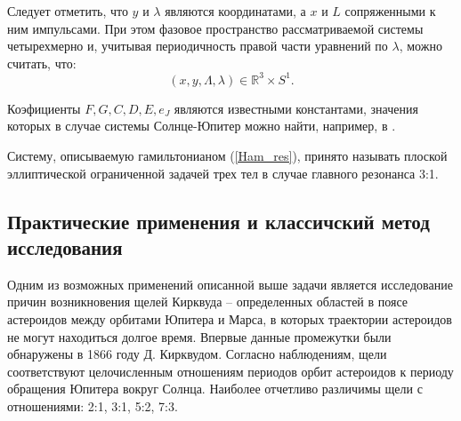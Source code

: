 Следует отметить, что $y$ и $\lambda$ являются координатами, а $x$ и $L$ сопряженными к ним импульсами. При этом фазовое пространство рассматриваемой системы  четырехмерно и, учитывая периодичность правой части уравнений по $\lambda$, можно считать, что:
$$(x,y,\Lambda,\lambda) \in \mathbb{R}^3 \times S^1 .$$

Коэфициенты $F,G,C,D,E,e_J$ являются известными константами, значения которых в случае системы Солнце-Юпитер можно найти, например, в \cite{wis1}.

Систему, описываемую гамильтонианом (\ref{Ham_res}), принято называть плоской эллиптической ограниченной задачей трех тел в случае главного резонанса 3:1.













































\subsection{Практические применения и классичский метод исследования}

Одним из возможных применений описанной выше задачи является исследование причин возникновения щелей Кирквуда -- определенных областей в поясе астероидов между орбитами Юпитера и Марса, в которых траектории астероидов не могут находиться долгое время. Впервые данные промежутки были обнаружены в 1866 году Д. Кирквудом. Согласно наблюдениям, щели соответствуют целочисленным отношениям периодов орбит астероидов к периоду обращения Юпитера вокруг Солнца. Наиболее отчетливо различимы щели с отношениями: 2:1, 3:1, 5:2, 7:3. 

